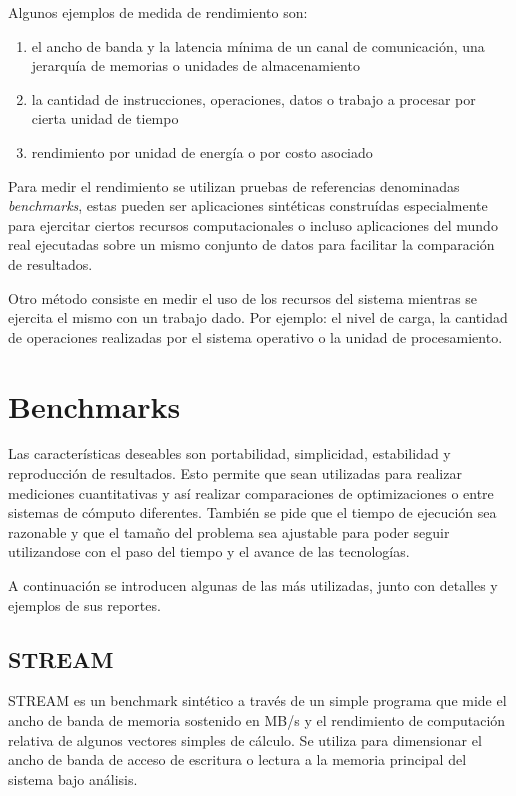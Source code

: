 \documentclass[a4paper]{report}
\begin{document}
Algunos ejemplos de medida de rendimiento son:

\begin{enumerate}
\item el ancho de banda y la latencia m\'inima de un canal de comunicaci\'on,
  una jerarqu\'ia de memorias o unidades   de almacenamiento
\item la cantidad de instrucciones, operaciones, datos o trabajo a procesar
  por cierta unidad de tiempo
\item rendimiento por unidad de energ\'ia o por costo asociado
\end{enumerate}

Para medir el rendimiento se utilizan pruebas de referencias denominadas
{\em benchmarks}, estas pueden ser aplicaciones sint\'eticas constru\'idas
especialmente para ejercitar ciertos recursos computacionales o incluso
aplicaciones del mundo real ejecutadas sobre un mismo conjunto de datos para
facilitar la comparaci\'on de resultados.

\bigskip

Otro m\'etodo consiste en medir el uso de los recursos del sistema mientras se
ejercita el mismo con un trabajo dado. Por ejemplo: el nivel de carga, la
cantidad de operaciones realizadas por el sistema operativo o la unidad de
procesamiento.

\section{Benchmarks}

Las caracter\'isticas deseables son portabilidad, simplicidad, estabilidad y
reproducci\'on de resultados. Esto permite que sean utilizadas para realizar
mediciones cuantitativas y as\'i realizar comparaciones de optimizaciones o
entre sistemas de c\'omputo diferentes. Tambi\'en se pide que el tiempo de
ejecuci\'on sea razonable y que el tama\~no del problema sea ajustable para
poder seguir utilizandose con el paso del tiempo y el avance de las
tecnolog\'ias.

\bigskip

A continuaci\'on se introducen algunas de las m\'as utilizadas, junto con
detalles y ejemplos de sus reportes.

\subsection{STREAM}

STREAM \cite{stream} es un benchmark sint\'etico a trav\'es de un simple
programa que mide el ancho de banda de memoria sostenido en MB/s y el
rendimiento de computaci\'on relativa de algunos vectores simples de c\'alculo.
Se utiliza para dimensionar el ancho de banda de acceso de escritura o lectura
a la memoria principal del sistema bajo an\'alisis.
\end{document}
